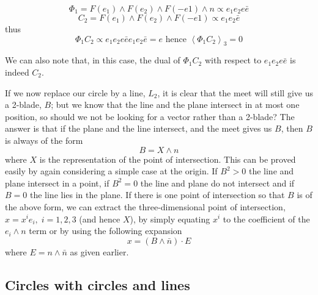 \[
\Phi_1 = F(e_1) \wedge F(e_2) \wedge F(-e1) \wedge n \propto e_1e_2e\bar{e}
\]
\[
C_2 = F(e_1) \wedge F(e_2) \wedge F(-e1) \propto e_1e_2\bar{e}
\]
thus
\[
\Phi_1C_2 \propto e_1e_2e\bar{e}e_1e_2\bar{e} = e \mbox{ hence }
\left<\Phi_1C_2\right>_3 = 0
\]

We can also note that, in this case, the dual of $\Phi_1C_2$ with respect to
$e_1e_2e\bar{e}$ is indeed $C_2$.

If we now replace our circle by a line, $L_2$, it is
clear that the meet will still give us a 2-blade, $B$;
but we know that the line and the plane intersect in at
most one position, so should we not be looking for a
vector rather than a 2-blade? The answer is that if the
plane and the line intersect, and the meet gives us $B$,
then $B$ is always of the form
%
\[  B = X\wedge n  \]
%
where $X$ is the representation of the point of intersection. This can be
proved easily by again considering a simple case at the
origin. If $B^2>0$ the line and plane intersect in a
point, if $B^2=0$ the line and plane do not intersect and
if $B=0$ the line lies in the plane. If there is one
point of intersection so that $B$ is of the above form,
we can extract the three-dimensional point of intersection,
$x=x^ie_i,\;i=1,2,3$ (and hence $X$), by simply equating
$x^i$ to the coefficient of the $e_i\wedge n$ term or by
using the following expansion
%
\begin{equation}
 x = (B\wedge \bar{n})\cdot E
 \end{equation}
%
where $E=n\wedge \bar{n}$ as given earlier.


\subsection{Circles with circles and lines }

